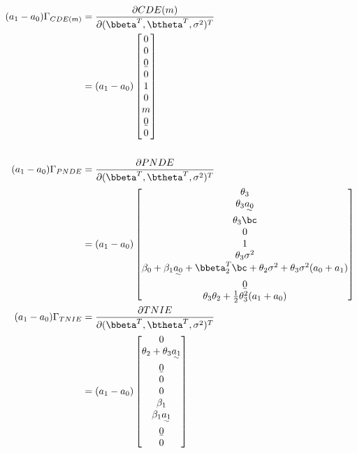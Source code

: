 \documentclass[10pt]{article}
\begin{document}
\begin{align*}
  (a_{1}-a_{0})\Gamma_{CDE(m)}
  &= \frac{\partial CDE(m)}{\partial (\bbeta^{T},\btheta^{T},\sigma^2)^{T}}\\
  &= (a_{1}-a_{0})
    \begin{bmatrix}
      0\\
      0\\
      \b0\\
      0\\
      1\\
      0\\
      m\\
      \b0\\
      0\\
    \end{bmatrix}\\
  \\
  (a_{1}-a_{0})\Gamma_{PNDE}
  &= \frac{\partial PNDE}{\partial (\bbeta^{T},\btheta^{T},\sigma^2)^{T}}\\
  &= (a_{1}-a_{0})
    \begin{bmatrix}
      \theta_{3}\\
      \theta_{3}\uwave{a_{0}}\\
      \theta_{3}\bc\\
      0\\
      1\\
      \theta_{3}\sigma^{2}\\
      \beta_{0} + \beta_{1}\uwave{a_{0}} + \bbeta_{2}^{T}\bc + \theta_{2}\sigma^{2} + \theta_{3}\sigma^{2}(a_{0} + a_{1})\\
      \b0\\
      \theta_{3}\theta_{2} + \frac{1}{2}\theta_{3}^{2}(a_{1} + a_{0})\\
    \end{bmatrix}\\
  (a_{1}-a_{0})\Gamma_{TNIE}
  &= \frac{\partial TNIE}{\partial (\bbeta^{T},\btheta^{T},\sigma^2)^{T}}\\
  &= (a_{1}-a_{0})
    \begin{bmatrix}
      0\\
      \theta_{2} + \theta_{3}\uwave{a_{1}}\\
      \b0\\
      0\\
      0\\
      \beta_{1}\\
      \beta_{1}\uwave{a_{1}}\\
      \b0\\
      0\\

\end{bmatrix}
\end{align*}
\end{document}
